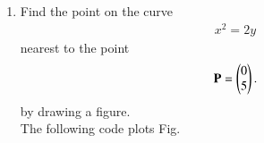 \renewcommand{\theequation}{\theenumi}
\begin{enumerate}[label=\arabic*.,ref=\thesection.\theenumi]

\item
	\label{prob:dist_pt_parab}
Find the point on the curve 
\begin{align}
\label{eq:dist_pt_parab}
x^2 = 2y
\end{align}
%
nearest to the point 
\begin{align}
\mathbf{P} = \begin{pmatrix}0\\5\end{pmatrix}.  
\end{align}
%
by drawing a figure.
\\
\solution 
The following code plots Fig. \label{fig:dist_pt_parab}

%	


\end{enumerate}
